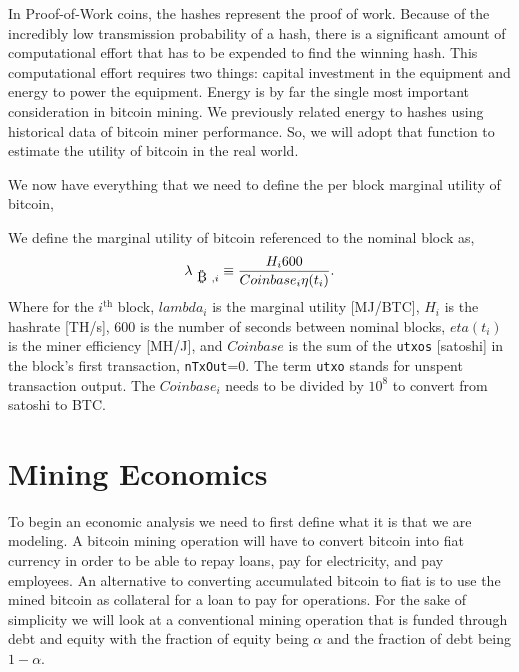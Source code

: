 \documentclass[runningheads]{llncs}
\def\bitcoin{
    \leavevmode
    \vtop{\offinterlineskip %
    \setbox0=\hbox{B}
    \setbox2=\hbox to\wd0{\hfil\hskip-.03em
    \vrule height .3ex width .15ex\hskip .08em
    \vrule height .3ex width .15ex\hfil}
    \vbox{\copy2\box0}\box2}
}
\begin{document}
In Proof-of-Work coins, the hashes represent the proof of work.
Because of the incredibly low transmission probability of a hash, there is a significant amount of computational effort that has to be expended to find the winning hash.
This computational effort requires two things: capital investment in the equipment and energy to power the equipment.
Energy is by far the single most important consideration in bitcoin mining.
We previously related energy to hashes using historical data of bitcoin miner performance.
So, we will adopt that function to estimate the utility of bitcoin in the real world.

We now have everything that we need to define the per block marginal utility of bitcoin,
\begin{definition}\label{def:3}
    We define the marginal utility of bitcoin referenced to the nominal block as,
    \begin{equation}
        \lambda_{\mbox{\bitcoin},i} \equiv \frac{H_i 600}{Coinbase_i \eta(t_i)}.\label{eq:9}
    \end{equation}
    Where for the $i^{\mbox{th}}$ block, $lambda_i$ is the marginal utility [MJ/BTC], $H_i$ is the hashrate [TH/s], 600 is the number of seconds between nominal blocks, $eta(t_i)$ is the miner efficiency [MH/J], and $Coinbase$ is the sum of the {\tt utxos} [satoshi] in the block's first transaction, {\tt nTxOut}=0.
    The term {\tt utxo} stands for unspent transaction output. The $Coinbase_i$ needs to be divided by $10^8$ to convert from satoshi to BTC.
\end{definition}


\section{Mining Economics}
To begin an economic analysis we need to first define what it is that we are modeling.
A bitcoin mining operation will have to convert bitcoin into fiat currency in order to be able to repay loans, pay for electricity, and pay employees.
An alternative to converting accumulated bitcoin to fiat is to use the mined bitcoin as collateral for a loan to pay for operations.
For the sake of simplicity we will look at a conventional mining operation that is funded through debt and equity with the fraction of equity being $\alpha$ and the fraction of debt being $1 - \alpha$.
\end{document}
